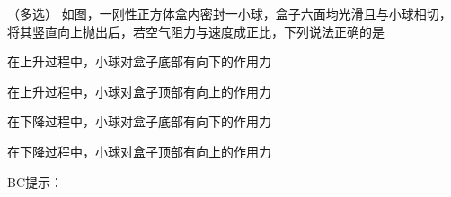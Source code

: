 （多选）
如图，一刚性正方体盒内密封一小球，盒子六面均光滑且与小球相切，将其竖直向上抛出后，若空气阻力与速度成正比，下列说法正确的是\paren[]

\begin{choices}
	\item 在上升过程中，小球对盒子底部有向下的作用力
	\item 在上升过程中，小球对盒子顶部有向上的作用力
	\item 在下降过程中，小球对盒子底部有向下的作用力
	\item 在下降过程中，小球对盒子顶部有向上的作用力
\end{choices}
\begin{answer}
    BC\qquad 提示：
\end{answer}
